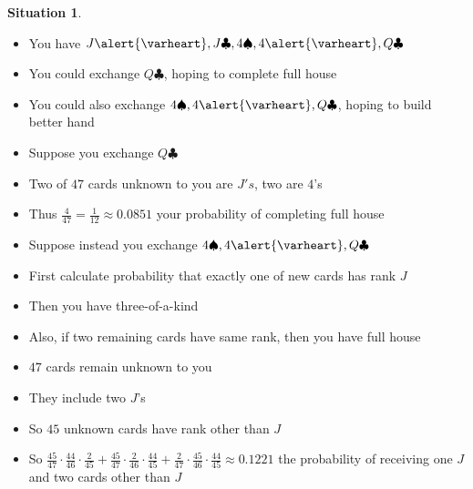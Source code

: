 \documentclass[handout]{beamer}
\theoremstyle{definition}
\newtheorem{situation}{Situation}
\newcommand{\hs}{\alert{\varheart}}
\newcommand{\s}{\spadesuit}
\newcommand{\cs}{\clubsuit}
\begin{document}
\begin{frame}
\begin{situation}
\begin{itemize}
\item You have $J\hs,J\cs,4\s,4\hs,Q\cs$
\item You could exchange $Q\cs$, hoping to complete full house
\item You could also exchange $4\s,4\hs,Q\cs$, hoping to build better hand
\end{itemize}
\end{situation}
\begin{itemize}
\item Suppose you exchange $Q\cs$
\item Two of $47$ cards unknown to you are $J's$, two are $4$'s
\item Thus $\frac{4}{47}=\frac{1}{12}\approx 0.0851$ your probability
of completing full house
\end{itemize}
\end{frame}

\begin{frame}
\begin{itemize}
\item Suppose instead you exchange $4\s,4\hs,Q\cs$
\item First calculate probability that exactly one of new cards
has rank $J$
\item Then you have three-of-a-kind
\item Also, if two remaining cards have same rank,
then you have full house
\item $47$ cards remain unknown to you
\item They include two $J$'s
\item So $45$ unknown cards have rank other than $J$
\item So $\frac{45}{47}\cdot\frac{44}{46}\cdot\frac{2}{45}
+\frac{45}{47}\cdot\frac{2}{46}\cdot\frac{44}{45}
+\frac{2}{47}\cdot\frac{45}{46}\cdot\frac{44}{45}\approx 0.1221$
the probability of receiving one $J$ and two cards other than $J$
\end{itemize}
\end{frame}
\end{document}
